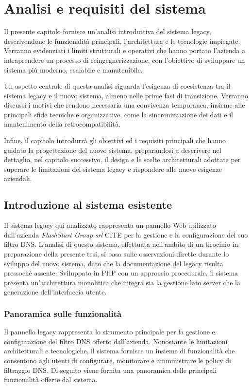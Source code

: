\chapter{Analisi e requisiti del sistema}

Il presente capitolo fornisce un'analisi introduttiva del sistema legacy, descrivendone le funzionalità principali, l'architettura e le tecnologie impiegate. Verranno evidenziati i limiti strutturali e operativi che hanno portato l'azienda a intraprendere un processo di reingegnerizzazione, con l'obiettivo di sviluppare un sistema più moderno, scalabile e manutenibile.

Un aspetto centrale di questa analisi riguarda l’esigenza di coesistenza tra il sistema legacy e il nuovo sistema, almeno nelle prime fasi di transizione. Verranno discussi i motivi che rendono necessaria una convivenza temporanea, insieme alle principali sfide tecniche e organizzative, come la sincronizzazione dei dati e il mantenimento della retrocompatibilità.

Infine, il capitolo introdurrà gli obiettivi ed i requisiti principali che hanno guidato la progettazione del nuovo sistema, preparandosi a descrivere nel dettaglio, nel capitolo successivo, il design e le scelte architetturali adottate per superare le limitazioni del sistema legacy e rispondere alle nuove esigenze aziendali.

\section{Introduzione al sistema esistente}
Il sistema legacy qui analizzato rappresenta un pannello Web utilizzato dall'azienda \textit{FlashStart Group srl} CITE per la gestione e la configurazione del suo filtro DNS. L’analisi di questo sistema, effettuata nell’ambito di un tirocinio in preparazione della presente tesi, si basa sulle osservazioni dirette durante lo sviluppo del nuovo sistema, dato che la documentazione del legacy risulta pressoché assente. Sviluppato in PHP con un approccio procedurale, il sistema presenta un’architettura monolitica che integra sia la gestione lato server che la generazione dell’interfaccia utente.

\subsection{Panoramica sulle funzionalità}
Il pannello legacy rappresenta lo strumento principale per la gestione e configurazione del filtro DNS offerto dall'azienda. Nonostante le limitazioni architetturali e tecnologiche, il sistema fornisce un insieme di funzionalità che consentono agli utenti di configurare, monitorare e amministrare le policy di filtraggio DNS. Di seguito viene fornita una panoramica delle principali funzionalità offerte dal sistema.

